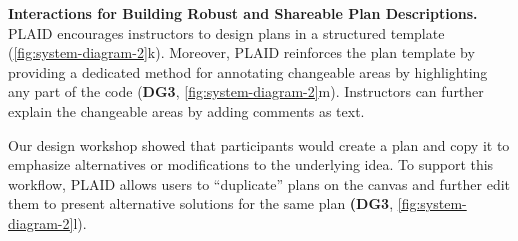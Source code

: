 

\textbf{Interactions for Building Robust and Shareable Plan Descriptions.}
PLAID encourages instructors to design plans in a structured template (\cref{fig:system-diagram-2}k). Moreover, PLAID reinforces the plan template by providing a dedicated method for annotating changeable areas by highlighting any part of the code (\textbf{DG3}, \cref{fig:system-diagram-2}m). Instructors can further explain the changeable areas by adding comments as text.

Our design workshop showed that participants would create a plan and copy it to emphasize alternatives or modifications to the underlying idea. To support this workflow,
PLAID allows users to ``duplicate'' plans on the canvas and further edit them to present alternative solutions for the same plan \textbf{(DG3}, \cref{fig:system-diagram-2}l).

